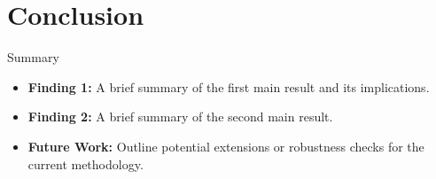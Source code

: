 \documentclass[10pt, aspectratio=169]{beamer}
\begin{document}
\section{Conclusion}
\begin{frame}{Summary}
    \begin{itemize}
        \item \textbf{Finding 1:} A brief summary of the first main result and its implications.
        \item \textbf{Finding 2:} A brief summary of the second main result.
        \item \textbf{Future Work:} Outline potential extensions or robustness checks for the current methodology.
    \end{itemize}
\end{frame}
\end{document}
